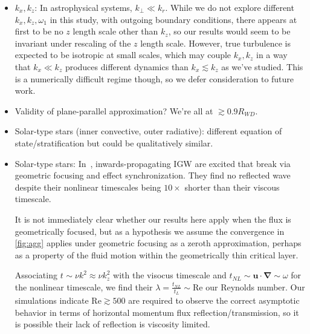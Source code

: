 \documentclass[
        fleqn,
        usenatbib,
    ]{mnras}
\newcommand*{\bm}[1]{\mathbf{#1}}
\begin{document}
\begin{itemize}
    \item $k_x, k_z$: In astrophysical systems, $k_{\perp} \ll k_r$. While we do
        not explore different $k_{x}, k_{z}, \omega_1$ in this study, with
        outgoing boundary conditions, there appears at first to be no $z$ length
        scale other than $k_{z}$, so our results would seem to be invariant
        under rescaling of the $z$ length scale. However, true turbulence is
        expected to be isotropic at small scales, which may couple $k_{x},
        k_{z}$ in a way that $k_{x} \ll k_{z}$ produces different dynamics
        than $k_{x} \lesssim k_{z}$ as we've studied. This is a numerically
        difficult regime though, so we defer consideration to future work.

    \item Validity of plane-parallel approximation? We're all at $\gtrsim
        0.9R_{WD}$.

    \item Solar-type stars (inner convective, outer radiative): different
        equation of state/stratification but could be qualitatively similar.

    \item Solar-type stars: In~\cite{barker_ogilvie}, inwards-propagating IGW
        are excited that break via geometric focusing and effect
        synchronization. They find no reflected wave despite their nonlinear
        timescales being $10\times$ shorter than their viscous timescale.

        It is not immediately clear whether our results here apply when the flux
        is geometrically focused, but as a hypothesis we assume the convergence
        in \autoref{fig:agg} applies under geometric focusing as a zeroth
        approximation, perhaps as a property of the fluid motion within the
        geometrically thin critical layer.

        Associating $t_{} \sim \nu k^2 \approx \nu k_z^2$ with the visocus
        timescale and $t_{NL} \sim \bm{u} \cdot \bm{\nabla} \sim \omega$ for
        the nonlinear timescale, we find their $\lambda = \frac{t_{NL}}{t_L}
        \sim \mathrm{Re}$ our Reynolds number. Our simulations indicate
        $\mathrm{Re} \gtrsim 500$ are required to observe the correct asymptotic
        behavior in terms of horizontal momentum flux reflection/transmission,
        so it is possible their lack of reflection is viscosity limited.
\end{itemize}
\end{document}
